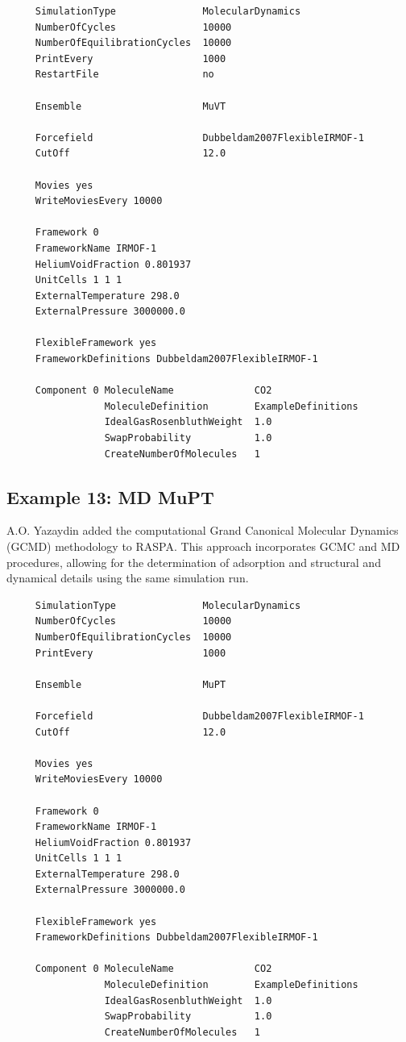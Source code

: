 \begin{tiny}
\begin{verbatim}
     SimulationType               MolecularDynamics
     NumberOfCycles               10000
     NumberOfEquilibrationCycles  10000
     PrintEvery                   1000
     RestartFile                  no
     
     Ensemble                     MuVT
     
     Forcefield                   Dubbeldam2007FlexibleIRMOF-1
     CutOff                       12.0
     
     Movies yes
     WriteMoviesEvery 10000
     
     Framework 0
     FrameworkName IRMOF-1
     HeliumVoidFraction 0.801937
     UnitCells 1 1 1
     ExternalTemperature 298.0
     ExternalPressure 3000000.0
     
     FlexibleFramework yes
     FrameworkDefinitions Dubbeldam2007FlexibleIRMOF-1
     
     Component 0 MoleculeName              CO2
                 MoleculeDefinition        ExampleDefinitions
                 IdealGasRosenbluthWeight  1.0
                 SwapProbability           1.0
                 CreateNumberOfMolecules   1
\end{verbatim}
\end{tiny}

\subsection*{Example 13: MD MuPT}

A.O. Yazaydin added the computational Grand Canonical Molecular Dynamics (GCMD) methodology to RASPA\cite{Loganathan2017,Loganathan2018}.
This approach incorporates GCMC and MD procedures, allowing for the determination of adsorption and structural and 
dynamical details using the same simulation run.
\begin{tiny}
\begin{verbatim}
     SimulationType               MolecularDynamics
     NumberOfCycles               10000
     NumberOfEquilibrationCycles  10000
     PrintEvery                   1000
     
     Ensemble                     MuPT
     
     Forcefield                   Dubbeldam2007FlexibleIRMOF-1
     CutOff                       12.0
     
     Movies yes
     WriteMoviesEvery 10000
     
     Framework 0
     FrameworkName IRMOF-1
     HeliumVoidFraction 0.801937
     UnitCells 1 1 1
     ExternalTemperature 298.0
     ExternalPressure 3000000.0
     
     FlexibleFramework yes
     FrameworkDefinitions Dubbeldam2007FlexibleIRMOF-1
     
     Component 0 MoleculeName              CO2
                 MoleculeDefinition        ExampleDefinitions
                 IdealGasRosenbluthWeight  1.0
                 SwapProbability           1.0
                 CreateNumberOfMolecules   1
\end{verbatim}
\end{tiny}

